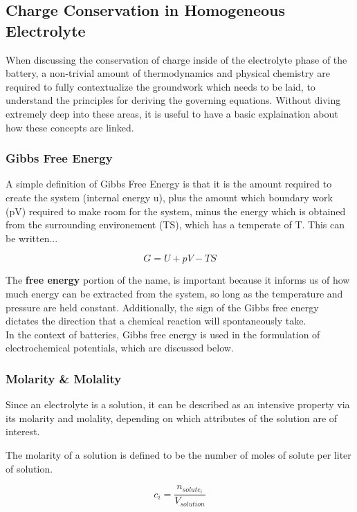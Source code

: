 \documentclass[lettersize,journal]{IEEEtran}
\begin{document}
\subsection{Charge Conservation in Homogeneous Electrolyte}

When discussing the conservation of charge inside of the electrolyte phase of the battery, a non-trivial amount of thermodynamics and physical chemistry are required to fully contextualize the groundwork which needs to be laid, to understand the principles for deriving the governing equations. Without diving extremely deep into these areas, it is useful to have a basic explaination about how these concepts are linked.

\subsubsection{Gibbs Free Energy}
A simple definition of Gibbs Free Energy is that it is the amount required to create the system (internal energy u), plus the amount which boundary work (pV) required to make room for the system, minus the energy which is obtained from the surrounding environement (TS), which has a temperate of T. This can be written...

\[
    G = U + pV - TS
\]

 The \textbf{free energy} portion of the name, is important because it informs us of how much energy can be extracted from the system, so long as the temperature and pressure are held constant. Additionally, the sign of the Gibbs free energy dictates the direction that a chemical reaction will spontaneously take. \\

 In the context of batteries, Gibbs free energy is used in the formulation of electrochemical potentials, which are discussed below.


 \subsubsection{Molarity \& Molality}

 Since an electrolyte is a solution, it can be described as an intensive property via its molarity and molality, depending on which attributes of the solution are of interest.

 The molarity of a solution is defined to be the number of moles of solute per liter of solution.

 \[
    c_i = \frac{n_{solute_i}}{V_{solution}}
 \]
\end{document}
